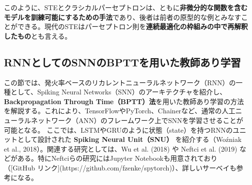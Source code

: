 このように、STEとクラシカルパーセプトロンは、ともに\textbf{非微分的な関数を含むモデルを訓練可能にするための手法}であり、後者は前者の原型的な例とみなすことができる。現代のSTEはパーセプトロン則を\textbf{連続最適化の枠組みの中で再解釈したもの}とも言える。
\subsection{RNNとしてのSNNのBPTTを用いた教師あり学習}
この節では、発火率ベースのリカレントニューラルネットワーク（RNN）の一種として、Spiking Neural Networks（SNN）のアーキテクチャを紹介し、\textbf{Backpropagation Through Time（BPTT）法}を用いた教師あり学習の方法を解説する。これにより、TensorFlowやPyTorch、Chainerなど、通常の人工ニューラルネットワーク（ANN）のフレームワーク上でSNNを学習させることが可能となる。
ここでは、LSTMやGRUのように状態（state）を持つRNNのユニットとして設計された \textbf{Spiking Neural Unit（SNU）} を紹介する（Woźniak et al., 2018）。関連する研究としては、Wu et al. (2018) や Neftci et al. (2019) などがある。特にNeftciらの研究にはJupyter Notebookも用意されており（[GitHub リンク](https://github.com/fzenke/spytorch)）、詳しいサーベイも参考になる。
